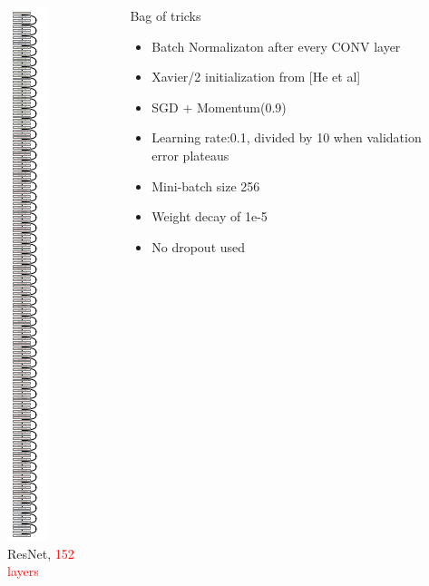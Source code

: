 \begin{frame}
	\begin{columns}
		\begin{overlayarea}{\textwidth}{\textheight}
			\vspace{0.3cm}
			\begin{figure}
				\begin{center}
					\includegraphics[scale=0.29]{images/resNet_layers.png}
					\caption*{ResNet, \textcolor{red} {152 layers}}
				\end{center}
			\end{figure}
		\end{overlayarea}
		\begin{overlayarea}{\textwidth}{\textheight}
			\begin{block}{Bag of tricks}
				\begin{itemize}
					\justifying
					\item<1-> Batch Normalizaton after every CONV layer
					\item<2-> Xavier/2 initialization from [He et al]
					\item<3-> SGD + Momentum(0.9)
					\item<4-> Learning rate:0.1, divided by 10 when validation error plateaus
					\item<5-> Mini-batch size 256
					\item<6-> Weight decay of 1e-5
					\item<7-> No dropout used
				\end{itemize}
			\end{block}
		\end{overlayarea}
	\end{columns}
\end{frame}

